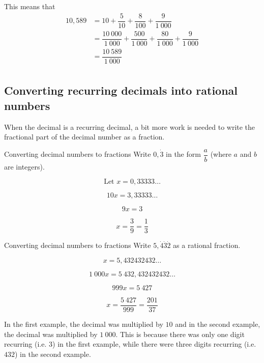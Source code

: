 This means that
\begin{align*}
  10,589 &= 10 + \dfrac{5}{10} + \dfrac{8}{100} + \dfrac{9}{1~000} \\
  &= \dfrac{10~000}{1~000} + \dfrac{500}{1~000} + \dfrac{80}{1~000} + \dfrac{9}{1~000} \\
  &= \dfrac{10~589}{1~000} \\
\end{align*}

\subsection{Converting recurring decimals into rational numbers}


When the decimal is a recurring decimal, a bit more work is needed to write the fractional part of the decimal number as a fraction.\par 

\begin{wex}
{%
Converting decimal numbers to fractions
}
{%
Write $0,\dot{3}$ in the form $\dfrac{a}{b}$ (where $a$ and $b$ are integers).
}
{%

$$\mbox{Let } x = 0,33333\ldots$$

$$10x = 3,33333\ldots$$

$$9x = 3 $$

$$ x = \dfrac{3}{9} = \dfrac{1}{3} $$
}
\end{wex}


\begin{wex}
{%
Converting decimal numbers to fractions
}
{%
Write $5,\dot{4}\dot{3}\dot{2}$ as a rational fraction.
}
{%

$$ x = 5,432432432\ldots $$

$$ 1~000x = 5~432,432432432\ldots $$

$$ 999x = 5~427 $$

$$ x = \dfrac{5~427}{999} = \dfrac{201}{37} $$
}
\end{wex}

In the first example, the decimal was multiplied by $10$ and in the
second example, the decimal was multiplied by $1~000$. This is because
there was only one digit recurring (i.e. $3$) in the first example,
while there were three digits recurring (i.e. $432$) in the second
example.\par 

